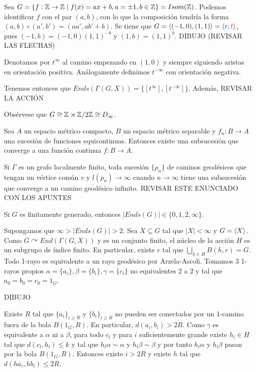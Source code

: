 \documentclass[twoside, 11pt]{article}
\begin{document}
\begin{ej}
Sea $G=\{f:\mathbb{Z}\to\mathbb{Z}\mid f(x)=ax+b, a=\pm 1, b\in\mathbb{Z}\}=Isom(\mathbb{Z})$. Podemos identificar $f$ con el par $(a,b)$, con lo que la composición tendría la forma $(a,b)\circ (a',b')=(aa',ab'+b)$. Se tiene que $G=\langle{(-1,0), (1,1)}\rangle=\langle{\color{blue}{r} ,\color{red}{t}}\rangle$, pues $(-1,b)=(-1,0)(1,1)^{-b}$ y $(1,b)=(1,1)^b$. 
DIBUJO (REVISAR LAS FLECHAS)

Denotamos por $t^\infty$ al camino empezando en $(1,0)$ y siempre siguiendo aristas en orientación positiva. Análogamente definimos $t^{-\infty}$ con orientación negativa. 

Tenemos entonces que $Ends(\Gamma(G,X))=\{[t^\infty],[t^{-\infty}]\}$. Además, REVISAR LA ACCIÓN

Obsérvese que $G\cong \mathbb{Z}\rtimes\mathbb{Z}/2\mathbb{Z}\cong D_\infty$.
\end{ej}

\begin{teorema}
Sea $A$ un espacio métrico compacto, $B$ un espacio métrico separable y $f_n:B\to A$ una sucesión de funciones equicontinuas. Entonces existe una subsucesión que converge a una función continua $f:B\to A$.
\end{teorema}

\begin{coro}
Si $\Gamma$ es un grafo localmente finito, toda sucesión $\{\rho_n\}$ de caminos geodésicos que tengan un vértice común $v$ y $l(p_n)\to\infty$ cuando $n\to\infty$ tiene una subsucesión que converge a un camino geodésico infinito. REVISAR ESTE ENUNCIADO CON LOS APUNTES
\end{coro}

\begin{prop}
Si $G$ es finitamente generado, entonces $|Ends(G)|\in\{0,1,2,\infty\}$.
\end{prop}
\begin{dem}
Supongamos que $\infty>|Ends(G)|>2$. Sea $X\subseteq G$ tal que $|X|<\infty$ y $G=\langle{X}\rangle$. Como $G\curvearrowright End(\Gamma(G,X))$ y es un conjunto finito, el núcleo de la acción $H$ es un subgrupo de índice finito. En particular, existe $r$ tal que $\bigcup_{h\in H}B(h,r)=G$. Todo 1-rayo es equivalente a un rayo geodésico por Arzela-Ascoli. Tomamos 3 1-rayos propios $\alpha=\{a_i\}, \beta=\{b_i\}, \gamma=\{c_i\}$ no equivalentes 2 a 2 y tal que $a_0=b_0=c_0=1_G$.

DIBUJO

Existe $R$ tal que $\{a_i\}_{i\geq R}$ y $\{b_i\}_{i\geq R}$ no pueden ser conectados por un 1-camino fuera de la bola $B(1_G,R)$. En particular, $d(a_i,b_i)>2R$. Como $\gamma$ es equivalente a $\alpha$ ni a $\beta$, para todo $c_l$ y para $i$ suficientemente grande existe $h_l\in H$ tal que $d(c_l,h_l)\leq k$ y tal que $h_l\alpha\sim \alpha$ y $h_l\beta\sim\beta$ y por tanto $h_l\alpha$ y $h_l\beta$ pasan por la bola $B(1_G,R)$. Entonces existe $i>2R$ y existe $h$ tal que $d(ha_i,hb_i)\leq 2R$.
\QED
\end{dem}
\end{document}
